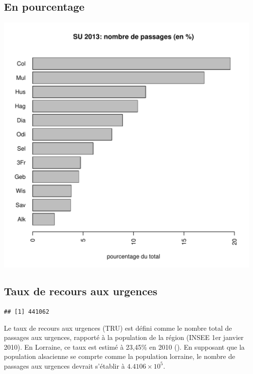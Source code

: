\documentclass[12pt,english,french,twoside]{report}\usepackage[]{graphicx}\usepackage[]{color}
\makeatletter
\def\maxwidth{ %
  \ifdim\Gin@nat@width>\linewidth
    \linewidth
  \else
    \Gin@nat@width
  \fi
}
\newenvironment{kframe}{%
 \def\at@end@of@kframe{}%
 \ifinner\ifhmode%
  \def\at@end@of@kframe{\end{minipage}}%
  \begin{minipage}{\columnwidth}%
 \fi\fi%
 \def\FrameCommand##1{\hskip\@totalleftmargin \hskip-\fboxsep
 \colorbox{shadecolor}{##1}\hskip-\fboxsep
     \hskip-\linewidth \hskip-\@totalleftmargin \hskip\columnwidth}%
 \MakeFramed {\advance\hsize-\width
   \@totalleftmargin\z@ \linewidth\hsize
   \@setminipage}}%
 {\par\unskip\endMakeFramed%
 \at@end@of@kframe}
\newenvironment{knitrout}{}{} %
\makeatother
\begin{document}
\subsection*{En pourcentage}
\begin{knitrout}
\color{fgcolor}
\includegraphics[width=\maxwidth]{figure/en_pourcentage} 

\end{knitrout}


\subsection*{Taux de recours aux urgences}
\begin{knitrout}
\color{fgcolor}\begin{kframe}
\begin{verbatim}
## [1] 441062
\end{verbatim}
\end{kframe}
\end{knitrout}

Le taux de recours aux urgences  (TRU)  est défini comme le nombre total de passages aux urgences, rapporté à la population de la région (INSEE 1er janvier 2010). En Lorraine, ce taux est estimé à 23,45\% en 2010 (\cite{2,3}). En supposant que la population alsacienne se comprte comme la population lorraine, le nombre de passages aux urgences devrait s'établir à \ensuremath{4.4106\times 10^{5}}.
\end{document}
